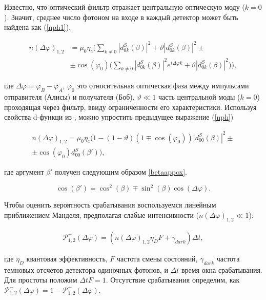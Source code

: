  Известно, что оптический фильтр отражает центральную оптическую моду ($k=0$). Значит, среднее число фотоном на входе в каждый детектор может быть найдена как (\ref{nph1}). 
 
\begin{align}\label{nph1}
    n(\Delta\varphi)_{1,2}&=\mu_0\eta_c\Bigg(\sum_{k\neq 0}|d_{0k}^{S}(\beta)|^2 + \vartheta|d_{0k}^{S}(\beta)|^2 \pm \nonumber \\
    &\pm \cos(\varphi_0)\Big(\sum_{k\neq 0}|d_{0k}^{S}(\beta)|^2e^{i\Delta\varphi k}+ \vartheta|d_{0k}^{S}(\beta)|^2 \Big) \Bigg),
\end{align}

где $\Delta\varphi=\varphi_B-\varphi_A$, $\varphi_0$ это относительная оптическая фаза между импульсами отправителя (Алисы) и получателя (Боб), $\vartheta \ll 1$ часть центральной моды ($k=0$) проходящая через фильтр, ввиду ограниченности его характеристики. Используя свойства d-функци из \cite{varshalovich1988quantum}, можно упростить предыдущее выражение (\ref{nph})

\begin{align}
    n(\Delta\varphi)_{1,2}=\mu_0\eta_c\Big(1-(1-\vartheta)(1\mp\cos(\varphi_0))|d_{00}^{S}(\beta)|^2 \pm \nonumber \\
    \pm\cos(\varphi_0)d_{00}^{S}(\beta')\Big) \label{nph},
\end{align}

где аргумент $\beta'$ получен следующим образом \ref{betaappox}. 

\begin{equation} \label{betaappox}
    \cos(\beta')=\cos^2(\beta) \mp \sin^2(\beta)\cos(\Delta\varphi).
\end{equation}

Чтобы оценить вероятность срабатывания воспользуемся линейным приближением Манделя, предполагая слабые интенсивности ($n(\Delta\varphi)_{1,2} \ll 1$):

\begin{eqnarray}
    \mathcal{P}_{1,2}^{+}(\Delta\varphi)=\left(n(\Delta\varphi)_{1,2}\eta_DF+\gamma_{dark}\right)\Delta t, \label{pdet}
\end{eqnarray}

где $\eta_D$ квантовая эффективность, $F$ частота смены состояний, $\gamma_{dark}$ частота темновых отсчетов детектора одиночных фотонов, и $\Delta t$ время окна срабатывания. Для простоты положим $\Delta t F=1$. Отсутствие срабатывания определим, как $\mathcal{P}_{1,2}^{-}(\Delta\varphi)=1-\mathcal{P}_{1,2}^{+}(\Delta\varphi)$.     


